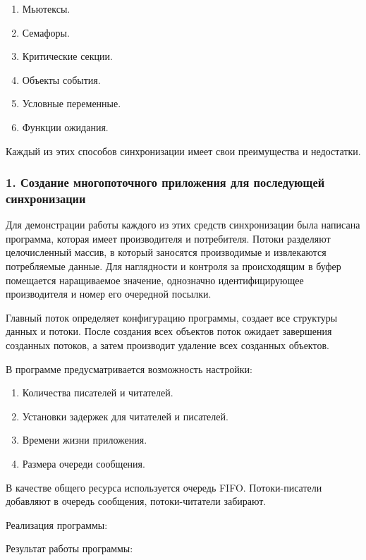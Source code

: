 \documentclass[14pt,a4paper,report]{report}
\begin{document}
\begin{enumerate}
	\item Мьютексы.
	\item Семафоры.	
	\item Критические секции.
	\item Объекты события.
	\item Условные переменные.
	\item Функции ожидания.
\end{enumerate}

Каждый из этих способов синхронизации имеет свои преимущества и недостатки.

\subsubsection{1. Создание многопоточного приложения для последующей синхронизации}

Для демонстрации работы каждого из этих средств синхронизации была написана программа, которая имеет производителя и потребителя. Потоки разделяют целочисленный массив, в который заносятся производимые и извлекаются потребляемые данные. Для наглядности и контроля за происходящим в буфер помещается наращиваемое значение, однозначно идентифицирующее производителя и номер его очередной посылки.

Главный поток определяет конфигурацию программы, создает все структуры данных и потоки. После создания всех объектов поток ожидает завершения созданных потоков, а затем производит удаление всех созданных объектов.

В программе предусматривается возможность настройки:

\begin{enumerate}
	\item Количества писателей и читателей.
	\item Установки задержек для читателей и писателей.
	\item Времени жизни приложения. 
	\item Размера очереди сообщения.
\end{enumerate}

В качестве общего ресурса используется очередь FIFO. Потоки-писатели добавляют в очередь сообщения, потоки-читатели забирают. 

Реализация программы:



\clearpage

Результат работы программы:
\end{document}
